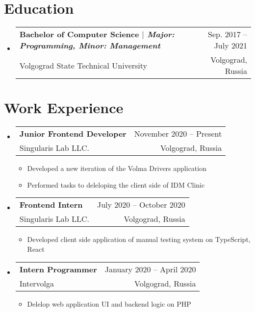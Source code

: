 \documentclass[A4,11pt]{article}
\makeatletter
\newcommand{\CVItem}[1]{
  \item\small{
    {#1 \vspace{-2pt}}
  }
}
\newcommand{\CVSubheading}[4]{
  \vspace{-2pt}\item
    \begin{tabular*}{0.97\textwidth}[t]{l@{\extracolsep{\fill}}r}
      \textbf{#1} & #2 \\
      \small#3 & \small #4 \\
    \end{tabular*}\vspace{-7pt}
}
\newcommand{\CVSubHeadingListStart}{\begin{itemize}[leftmargin=0.5cm, label={}]}
\newcommand{\CVSubHeadingListEnd}{\end{itemize}}
\newcommand{\CVItemListStart}{\begin{itemize}}
\newcommand{\CVItemListEnd}{\end{itemize}\vspace{-5pt}}
\makeatother
\begin{document}
\section{Education}
  \CVSubHeadingListStart
    \CVSubheading
      {{Bachelor of Computer Science $|$ \emph{\small{Major: Programming, Minor: Management}}}}{Sep. 2017 -- July 2021}
      {Volgograd State Technical University}{Volgograd, Russia}
  \CVSubHeadingListEnd

\begin{comment}
try to briefly explain what you did and why it is relevant to the position you
are seeking
\end{comment}

\section{Work Experience}
  \CVSubHeadingListStart
    \CVSubheading
      {Junior Frontend Developer}{November 2020 -- Present}
      {Singularis Lab LLC.}{Volgograd, Russia}
      \CVItemListStart
        \CVItem{Developed a new iteration of the Volma Drivers application}
        \CVItem{Performed tasks to deleloping the client side of IDM Clinic}
      \CVItemListEnd
    \CVSubheading
      {Frontend Intern}{July 2020 -- October 2020}
      {Singularis Lab LLC.}{Volgograd, Russia}
      \CVItemListStart
        \CVItem{Developed client side application of manual testing system on TypeScript, React}
    \CVItemListEnd
    \CVSubheading
      {Intern Programmer}{January 2020 -- April 2020}
      {Intervolga}{Volgograd, Russia}
      \CVItemListStart
        \CVItem{Delelop web application UI and backend logic on PHP}
      \CVItemListEnd
  \CVSubHeadingListEnd

\begin{comment}
Ideally the title of the work should speak for what it is. However if you feel
like you should explain more about why the project is applicable to this job,
use item list as is shown in the work experience section.
\end{comment}
\end{document}
